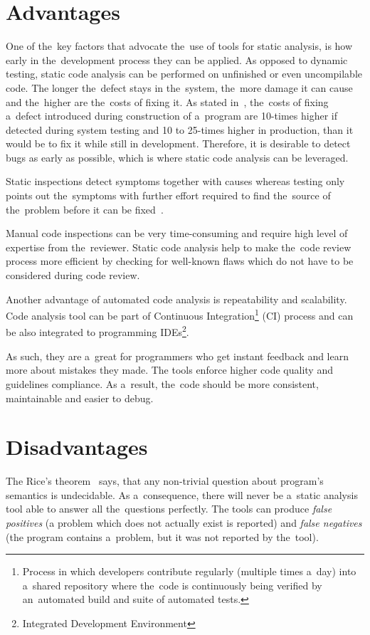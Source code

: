 \documentclass[
  digital, %
  table,   %
  lof,     %
  lot,     %
  oneside,
]{fithesis3}
\begin{document}
\section{Advantages}
One of the~key factors that advocate the~use of tools for static analysis, is how early in the~development process they can be applied. As opposed to dynamic testing, static code analysis can be performed on unfinished or even uncompilable code. The longer the~defect stays in the~system, the~more damage it can cause and the~higher are the~costs of fixing it. As stated in~\cite[p. 29]{code-complete}, the~costs of fixing a~defect introduced during construction of a~program are 10-times higher if detected during system testing and 10 to 25-times higher in production, than it would be to fix it while still in development. Therefore, it is desirable to detect bugs as early as possible, which is where static code analysis can be leveraged.

Static inspections detect symptoms together with causes whereas testing only points out the~symptoms with further effort required to find the~source of the~problem before it can be fixed~\cite[p. 472]{code-complete}.

Manual code inspections can be very time-consuming and require high level of expertise from the~reviewer. Static code analysis help to make the~code review process more efficient by checking for well-known flaws which do not have to be considered during code review.

Another advantage of automated code analysis is repeatability and scalability. Code analysis tool can be part of Continuous Integration\footnote{Process in which developers contribute regularly (multiple times a~day) into a~shared repository where the~code is continuously being verified by an~automated build and suite of automated tests.} (CI) process and can be also integrated to programming IDEs\footnote{Integrated Development Environment}. 

As such, they are a~great for programmers who get instant feedback and learn more about mistakes they made. The tools enforce higher code quality and guidelines compliance. As a~result, the~code should be more consistent, maintainable and easier to debug.
  
\section{Disadvantages}
The Rice's theorem~\cite{direct-proofs-of-rices-theorem} says, that any non-trivial question about program's semantics is undecidable. As a~consequence, there will never be a~static analysis tool able to answer all the~questions perfectly. The tools can produce \textit{false positives} (a problem which does not actually exist is reported) and \textit{false negatives} (the program contains a~problem, but it was not reported by the~tool).
\end{document}
